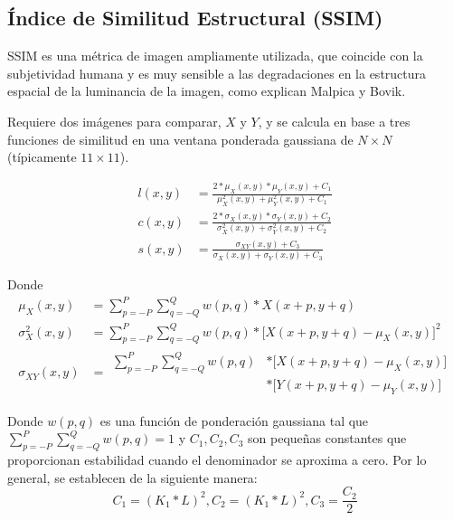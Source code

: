 \documentclass[pregrado]{tesis-usb} %
\begin{document}
\subsection{Índice de Similitud Estructural (SSIM)}
SSIM es una métrica de imagen ampliamente utilizada, que coincide con la subjetividad humana y es muy sensible a las degradaciones en la estructura espacial de la luminancia de la imagen, como explican Malpica y Bovik. \cite{Malpica2009}

Requiere dos imágenes para comparar, $X$ y $Y$, y se calcula en base a tres funciones de similitud en una ventana ponderada gaussiana de $N\times N$ (típicamente $11\times 11$).

\begin{equation}\label{eq:ssim_components}
\begin{split}
l(x,y) & = \frac{2*\mu_X(x,y)*\mu_Y(x,y)+C_1}{\mu_X^2(x,y)+\mu_Y^2(x,y)+C_1} \\ 
c(x,y) & = \frac{2*\sigma_X(x,y)*\sigma_Y(x,y)+C_2}{\sigma_X^2(x,y)+\sigma_Y^2(x,y)+C_2} \\ 
s(x,y) & = \frac{\sigma_{XY}(x,y)+C_3}{\sigma_X(x,y)+\sigma_Y(x,y)+C_3}
\end{split}
\end{equation}

Donde
\begin{equation*}
\begin{split}
\mu_X(x,y) & = \sum\limits_{p=-P}^{P} \sum\limits_{q=-Q}^{Q} w(p,q)*X(x+p,y+q)\\ 
\sigma_X^2(x,y) & = \sum\limits_{p=-P}^{P} \sum\limits_{q=-Q}^{Q} w(p,q)*\lbrack X(x+p,y+q)-\mu_X(x,y) \rbrack^2\\ 
\sigma_{XY}(x,y) & = \begin{split}\sum\limits_{p=-P}^{P} \sum\limits_{q=-Q}^{Q} w(p,q)& *\lbrack X(x+p,y+q)-\mu_X(x,y)\rbrack \\ & *\lbrack Y(x+p,y+q)-\mu_Y(x,y)\rbrack\end{split}
\end{split}
\end{equation*}

Donde $w(p, q)$ es una función de ponderación gaussiana tal que $\sum\limits_{p = -P}^{P}\sum\limits_{q = -Q}^{Q} w(p, q) = 1$ y $C_1, C_2, C_3$ son pequeñas constantes que proporcionan estabilidad cuando el denominador se aproxima a cero. Por lo general, se establecen de la siguiente manera: 
\begin{equation*}
	C_1=(K_1*L)^2,C_2=(K_1*L)^2,C_3=\frac{C_2}{2}
\end{equation*}
\end{document}

